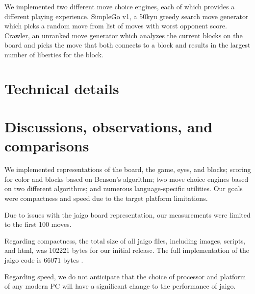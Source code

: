 \documentclass{memoir}
\begin{document}
We implemented two different move choice engines, each of which provides a different playing experience. SimpleGo v1, a 50kyu greedy search move generator which picks a random move from list of moves with worst opponent score. Crawler, an unranked move generator which analyzes the current blocks on the board and picks the move that both connects to a block and results in the largest number of liberties for the block.

\chapter{Technical details}
\lstset{language=Java,breaklines=true}%




\chapter{Discussions, observations, and comparisons}
We implemented representations of the board, the game, eyes, and blocks; scoring for color and blocks based on Benson's algorithm; two move choice engines based on two different algorithms; and numerous language-specific utilities. Our goals were compactness and speed due to the target platform limitations.

Due to issues with the jaigo board representation, our measurements were limited to the first 100 moves.

Regarding compactness, the total size of all jaigo files, including images, scripts, and html, was 102221 bytes for our initial release. The full implementation of the jaigo code is 66071 bytes \cite{SpeedReport}.

Regarding speed, we do not anticipate that the choice of processor and platform of any modern PC will have a significant change to the performance of jaigo.
\end{document}
